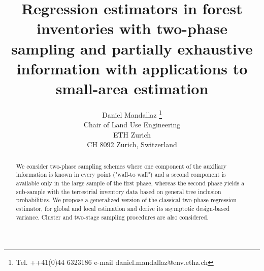 \documentclass[a4paper,12pt,leqno, titlepage]{article}
\begin{document}
\doublespacing
\pagestyle{plain}

\title{Regression estimators in forest inventories with two-phase sampling and partially exhaustive information with applications to small-area estimation}
\author{Daniel Mandallaz \thanks{Tel. ++41(0)44 6323186 e-mail
    daniel.mandallaz@env.ethz.ch} \\Chair of Land Use Engineering\\ETH Zurich\\CH 8092 Zurich, Switzerland}
\date{}

\maketitle
\newpage
\nolinenumbers
\begin{abstract}
We consider two-phase sampling schemes where one component of the auxiliary information is known in every point ("wall-to wall") and a second component is available only in the large sample of the first phase, whereas the second phase yields a sub-sample with the terrestrial inventory data based on general tree inclusion probabilities. We propose a generalized version of the classical two-phase regression estimator, for global and local estimation and derive its asymptotic design-based variance. Cluster and two-stage sampling procedures are also considered.

\end{abstract}
\clearpage
\end{document}
